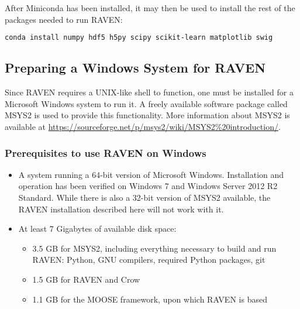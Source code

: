 After Miniconda has been installed, it may then be used to install the rest of the packages needed to run RAVEN:

\begin{lstlisting}[language=bash]
conda install numpy hdf5 h5py scipy scikit-learn matplotlib swig
\end{lstlisting}

\subsection{Preparing a Windows System for RAVEN}
\label{sysprep_windows}

Since RAVEN requires a UNIX-like shell to function, one must be installed for a Microsoft
Windows system to run it.  A freely available software package called MSYS2 is used to
provide this functionality.  More information about MSYS2 is available at
\url{https://sourceforge.net/p/msys2/wiki/MSYS2%20introduction/}.

\subsubsection{Prerequisites to use RAVEN on Windows}
\begin{itemize}
    \item A system running a 64-bit version of Microsoft Windows. Installation and operation
        has been verified on Windows 7 and Windows Server 2012 R2 Standard. While there
        is also a 32-bit version of MSYS2 available, the RAVEN installation described here will not work with it.
    \item At least 7 Gigabytes of available disk space:
    \begin{itemize}
        \item 3.5 GB for MSYS2, including everything necessary to build and run RAVEN: Python, GNU compilers, required Python packages, git
        \item 1.5 GB for RAVEN and Crow
        \item 1.1 GB for the MOOSE framework, upon which RAVEN is based
    \end{itemize}
\end{itemize}

